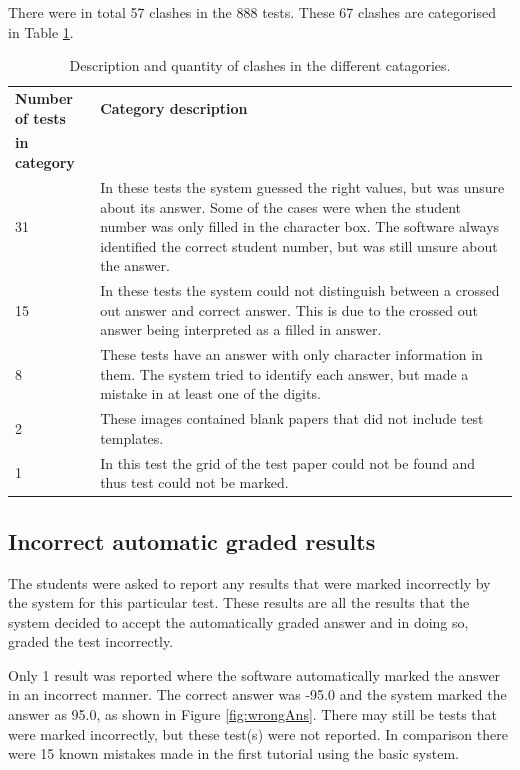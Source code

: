 There were in total 57 clashes in the 888 tests. These 67 clashes are categorised in Table  \ref{tbl:TutClash}.
\begin{table}
  \centering
  \caption{Description and quantity of clashes in the different catagories.} \label{tbl:TutClash}
\begin{tabular}{|p{3cm}|p{8cm}|}
\hline
\textbf{Number of tests} & \textbf{Category description}\\
\textbf{in category} &\\
\hline
31&In these tests the system guessed the right values, but was unsure about its answer. Some of the cases were when the student number was only filled in the character box. The software always identified the correct student number, but was still unsure about the answer.\\
\hline
15&In these tests the system could not distinguish between a crossed out answer and correct answer. This is due to the crossed out answer being interpreted as a filled in answer.\\
\hline
8&These tests have an answer with only character information in them. The system tried to identify each answer, but made a mistake in at least one of the digits.\\
\hline
2&These images contained blank papers that did not include test templates.\\
\hline
1&In this test the grid of the test paper could not be found and thus test could not be marked.\\
\hline
\end{tabular}
\end{table}

\subsection{Incorrect automatic graded results}

The students were asked to report any results that were marked incorrectly by the system for this particular test. These results are all the results that the system decided to accept the automatically graded answer and in doing so, graded the test incorrectly.

Only 1 result was reported where the software automatically marked the answer in an incorrect manner. The correct answer was -95.0 and the system marked the answer as 95.0, as shown in Figure \ref{fig:wrongAns}. There may still be tests that were marked incorrectly, but these test(s) were not reported. In comparison there were 15 known mistakes made in the first tutorial using the basic system.

